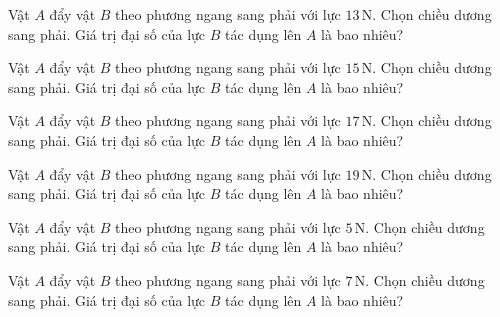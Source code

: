 \begin{ex}
Vật $A$ đẩy vật $B$ theo phương ngang sang phải với lực $13\,\text{N}$. Chọn chiều dương sang phải. Giá trị đại số của lực $B$ tác dụng lên $A$ là bao nhiêu?
\end{ex}

\begin{ex}
Vật $A$ đẩy vật $B$ theo phương ngang sang phải với lực $15\,\text{N}$. Chọn chiều dương sang phải. Giá trị đại số của lực $B$ tác dụng lên $A$ là bao nhiêu?
\end{ex}

\begin{ex}
Vật $A$ đẩy vật $B$ theo phương ngang sang phải với lực $17\,\text{N}$. Chọn chiều dương sang phải. Giá trị đại số của lực $B$ tác dụng lên $A$ là bao nhiêu?
\end{ex}

\begin{ex}
Vật $A$ đẩy vật $B$ theo phương ngang sang phải với lực $19\,\text{N}$. Chọn chiều dương sang phải. Giá trị đại số của lực $B$ tác dụng lên $A$ là bao nhiêu?
\end{ex}

\begin{ex}
Vật $A$ đẩy vật $B$ theo phương ngang sang phải với lực $5\,\text{N}$. Chọn chiều dương sang phải. Giá trị đại số của lực $B$ tác dụng lên $A$ là bao nhiêu?
\end{ex}

\begin{ex}
Vật $A$ đẩy vật $B$ theo phương ngang sang phải với lực $7\,\text{N}$. Chọn chiều dương sang phải. Giá trị đại số của lực $B$ tác dụng lên $A$ là bao nhiêu?
\end{ex}

